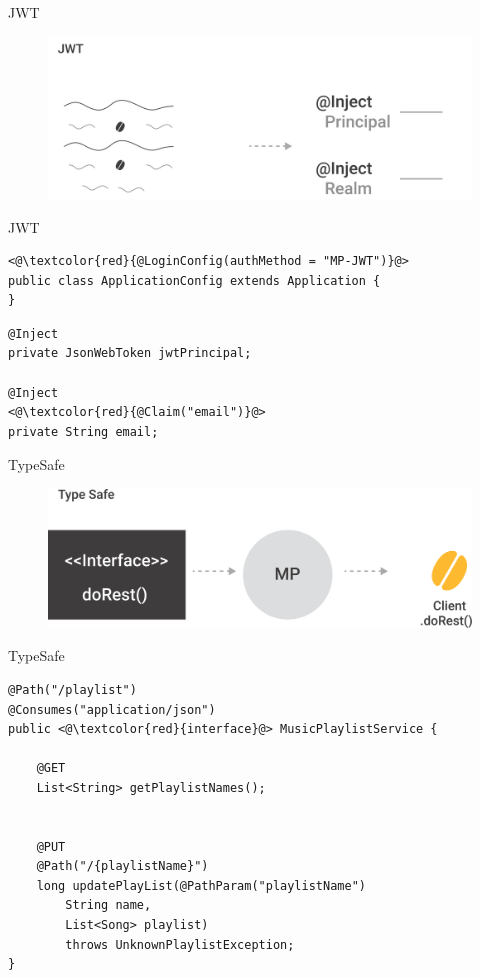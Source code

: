 \documentclass{beamer}
\begin{document}
\begin{frame}{JWT}
\begin{figure}
	\centering
	\includegraphics[width=0.9\linewidth]{Images/jwt}
\end{figure}
\end{frame}


\begin{frame}[fragile]{JWT}

\begin{lstlisting}
<@\textcolor{red}{@LoginConfig(authMethod = "MP-JWT")}@>
public class ApplicationConfig extends Application {
}
\end{lstlisting}

\begin{lstlisting}
@Inject
private JsonWebToken jwtPrincipal;

@Inject
<@\textcolor{red}{@Claim("email")}@>
private String email;
\end{lstlisting}
\end{frame}

\begin{frame}{TypeSafe}
\begin{figure}
	\centering
	\includegraphics[width=0.75\linewidth]{Images/typesafe}
\end{figure}
\end{frame}

\begin{frame}[fragile]{TypeSafe}


\begin{lstlisting}
@Path("/playlist")
@Consumes("application/json")
public <@\textcolor{red}{interface}@> MusicPlaylistService {

	@GET
	List<String> getPlaylistNames();

	
	@PUT
	@Path("/{playlistName}")
	long updatePlayList(@PathParam("playlistName")
		String name,
		List<Song> playlist)
		throws UnknownPlaylistException;
}
\end{lstlisting}
\end{frame}
\end{document}
